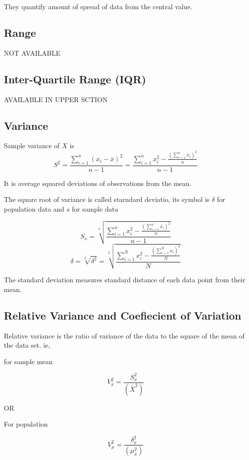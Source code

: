 \documentclass[12pt]{article}
\begin{document}
They quantify amount of spread of data from the central value.
\subsection{Range}
NOT AVAILABLE
\subsection{Inter-Quartile Range (IQR)}
AVAILABLE IN UPPER SCTION
\subsection{Variance}
Sample variance of $X$ is
\begin{equation}
    S^2 = \frac{\sum_{i = 1}^{n}(x_i - \bar{x})^2}{n - 1} = \frac{\sum_{i = 1}^{n} x_i^2 - \frac{(\sum_{i = 1}^{n}x_i)^2}{n}}{n-1}
\end{equation}

It is average squared deviations of observations from the mean.

The square root of variance is called starndard deviatio, its symbol is $\delta$ for population data and $s$ for sample data

\begin{equation}
    S_x = \sqrt[2]{\frac{\sum_{i = 1}^{n} x_i^2 - \frac{(\sum_{i = 1}^{n}x_i)^2}{n}}{n-1}}
\end{equation}
\begin{equation}
    \delta = \sqrt[2]{\delta^2} = \sqrt[2]{\frac{\sum_{i = 1}^{N} x_i^2 - \frac{(\sum_{i = 1}^{N}x_i)^2}{N}}{N}}
\end{equation}

The standard deviation measures standard distance of each data point from their mean.
\subsection{Relative Variance and Coefiecient of Variation}

Relative variance is the ratio of variance of the data to the square of the mean of the data set. ie,
\begin{center}
    for sample mean
\end{center}
\begin{equation}
    V_{\bar{x}}^2 = \frac{S_x^2}{(\bar{X}^2)}
\end{equation}
\begin{center}
    OR
\end{center}
\begin{center}
    For population
\end{center}
\begin{equation}
    V_{\mu}^2 = \frac{\delta_x^2}{(\mu_x^2)}
\end{equation}
\end{document}
